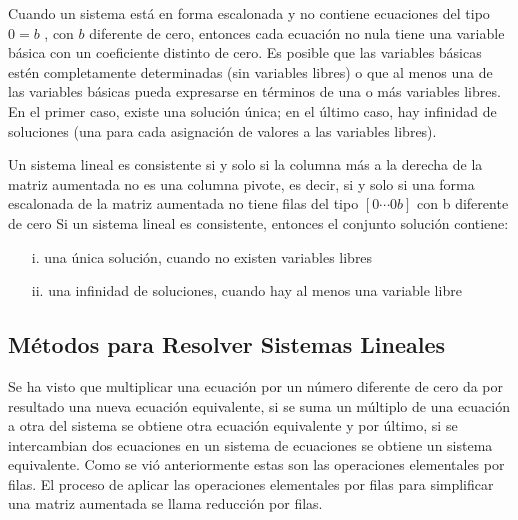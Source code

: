 \documentclass{article}
\begin{document}
Cuando un sistema está en forma escalonada y no contiene ecuaciones del tipo $0=b$ , con $b$ diferente de cero, entonces cada ecuación no nula tiene una variable básica con un coeficiente distinto de cero. Es posible que las variables básicas estén completamente determinadas (sin variables libres) o que al menos una de las variables básicas pueda expresarse en términos de una o más variables libres. En el primer caso, existe una solución única; en el último caso, hay infinidad de soluciones (una para cada asignación de valores a las variables libres).

\begin{tcolorbox}[colback=green!20!white,colframe=green!80!black,title=Teorema de Unicidad y Existencia]
    Un sistema lineal es consistente si y solo si la columna más a la derecha de la matriz aumentada no es una columna pivote, es decir, si y solo si una forma escalonada de la matriz aumentada no tiene filas del tipo
    $[0 \dotsb 0 b]$ con b diferente de cero
    Si un sistema lineal es consistente, entonces el conjunto solución contiene:
    \begin{itemize}
        \item[i.] una única solución, cuando no existen variables libres
        \item[ii.]una infinidad de soluciones, cuando hay al menos una variable libre
    \end{itemize}
\end{tcolorbox}

\subsection{Métodos para Resolver Sistemas Lineales}

Se ha visto que multiplicar una ecuación por un número diferente de cero da por resultado una nueva ecuación equivalente, si se suma un múltiplo de una ecuación a otra del sistema se obtiene otra ecuación equivalente y por último, si se intercambian dos ecuaciones en un sistema de ecuaciones se obtiene un sistema equivalente. Como se vió anteriormente estas son las operaciones elementales por filas. El proceso de aplicar las operaciones elementales por filas para simplificar una matriz aumentada se llama reducción por filas. 
\end{document}
